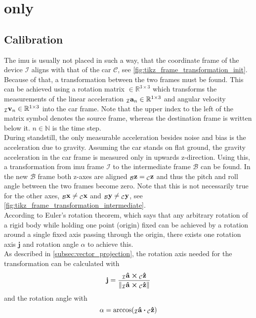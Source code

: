 \section{ only}
\subsection{Calibration}
The \gls{imu} is usually not placed in such a way, that the coordinate frame of the device $\mathcal{I}$ aligns with that of the car $\mathcal{C}$, see \cref{fig:tikz_frame_transformation_init}.
Because of that, a transformation between the two frames must be found.
This can be achieved using a rotation matrix  $\in \mathbb{R}^{3\times3}$ which transforms the measurements of the linear acceleration $\vincs{a}{I}_n \in \mathbb{R}^{1\times3}$ and angular velocity ${\vincs{v}{I}_n \in \mathbb{R}^{1\times3}}$ into the car frame.
Note that the upper index to the left of the matrix symbol denotes the source frame, whereas the destination frame is written below it.
$n \in \mathbb{N}$ is the time step.\\
During standstill, the only measurable acceleration besides noise and bias is the acceleration due to gravity.
Assuming the car stands on flat ground, the gravity acceleration in the car frame is measured only in upwards z-direction.
Using this, a transformation from \gls{imu} frame $\mathcal{I}$ to the intermediate frame $\mathcal{B}$ can be found.
In the new $\mathcal{B}$ frame both z-axes are aligned $\vincs{z}{b} = \vincs{z}{c}$ and thus the pitch and roll angle between the two frames become zero.
Note that this is not necessarily true for the other axes, $\vincs{x}{b}\neq\vincs{x}{c}$ and $\vincs{y}{b}\neq\vincs{y}{c}$, see \cref{fig:tikz_frame_transformation_intermediate}.\\
According to Euler's rotation theorem, which says that any arbitrary rotation of a rigid body while holding one point (origin) fixed can be achieved by a rotation around a single fixed axis passing through the origin, there exists one rotation axis $\mathbf{j}$ and rotation angle $\alpha$ to achieve this.\\
As described in \cref{subsec:vector_projection}, the rotation axis needed for the transformation can be calculated with
\begin{equation}
    \vb{j} = \frac{\vincs{\vu{a}}{i} \cp \vincs{\vu{z}}{c}}{\norm{\vincs{\vu{a}}{i} \cp \vincs{\vu{z}}{c}}}
\end{equation}
and the rotation angle with
\begin{equation}
    \alpha = \arccos(\vincs{\vu{a}}{i}\vdot \vincs{\vu{z}}{c})
\end{equation}
